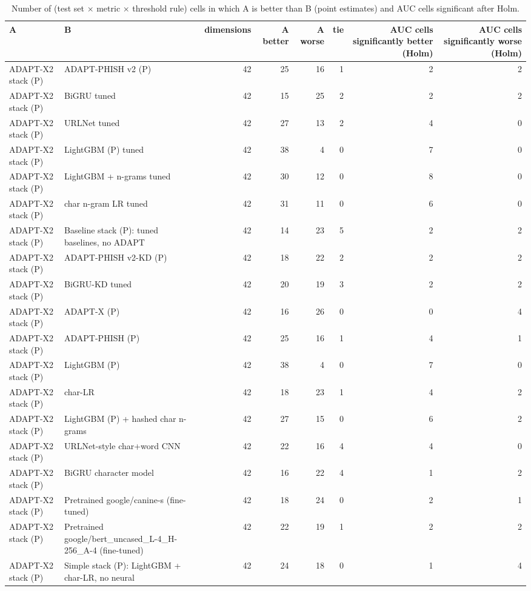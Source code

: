 \begin{table}[t]
\centering
\scriptsize
\caption{Number of (test set × metric × threshold rule) cells in which A is better than B (point estimates) and AUC cells significant after Holm.}
\label{tab:rev_R15_v14_dimension_counts}
\begin{tabular}{llrrrrrr}
\toprule
A & B & dimensions & A better & A worse & tie & AUC cells significantly better (Holm) & AUC cells significantly worse (Holm) \\
\midrule
ADAPT-X2 stack (P) & ADAPT-PHISH v2 (P) & 42 & 25 & 16 & 1 & 2 & 2 \\
ADAPT-X2 stack (P) & BiGRU tuned & 42 & 15 & 25 & 2 & 2 & 2 \\
ADAPT-X2 stack (P) & URLNet tuned & 42 & 27 & 13 & 2 & 4 & 0 \\
ADAPT-X2 stack (P) & LightGBM (P) tuned & 42 & 38 & 4 & 0 & 7 & 0 \\
ADAPT-X2 stack (P) & LightGBM + n-grams tuned & 42 & 30 & 12 & 0 & 8 & 0 \\
ADAPT-X2 stack (P) & char n-gram LR tuned & 42 & 31 & 11 & 0 & 6 & 0 \\
ADAPT-X2 stack (P) & Baseline stack (P): tuned baselines, no ADAPT & 42 & 14 & 23 & 5 & 2 & 2 \\
ADAPT-X2 stack (P) & ADAPT-PHISH v2-KD (P) & 42 & 18 & 22 & 2 & 2 & 2 \\
ADAPT-X2 stack (P) & BiGRU-KD tuned & 42 & 20 & 19 & 3 & 2 & 2 \\
ADAPT-X2 stack (P) & ADAPT-X (P) & 42 & 16 & 26 & 0 & 0 & 4 \\
ADAPT-X2 stack (P) & ADAPT-PHISH (P) & 42 & 25 & 16 & 1 & 4 & 1 \\
ADAPT-X2 stack (P) & LightGBM (P) & 42 & 38 & 4 & 0 & 7 & 0 \\
ADAPT-X2 stack (P) & char-LR & 42 & 18 & 23 & 1 & 4 & 2 \\
ADAPT-X2 stack (P) & LightGBM (P) + hashed char n-grams & 42 & 27 & 15 & 0 & 6 & 2 \\
ADAPT-X2 stack (P) & URLNet-style char+word CNN & 42 & 22 & 16 & 4 & 4 & 0 \\
ADAPT-X2 stack (P) & BiGRU character model & 42 & 16 & 22 & 4 & 1 & 2 \\
ADAPT-X2 stack (P) & Pretrained google/canine-s (fine-tuned) & 42 & 18 & 24 & 0 & 2 & 1 \\
ADAPT-X2 stack (P) & Pretrained google/bert\_uncased\_L-4\_H-256\_A-4 (fine-tuned) & 42 & 22 & 19 & 1 & 2 & 2 \\
ADAPT-X2 stack (P) & Simple stack (P): LightGBM + char-LR, no neural & 42 & 24 & 18 & 0 & 1 & 4 \\

\end{tabular}
\end{table}
